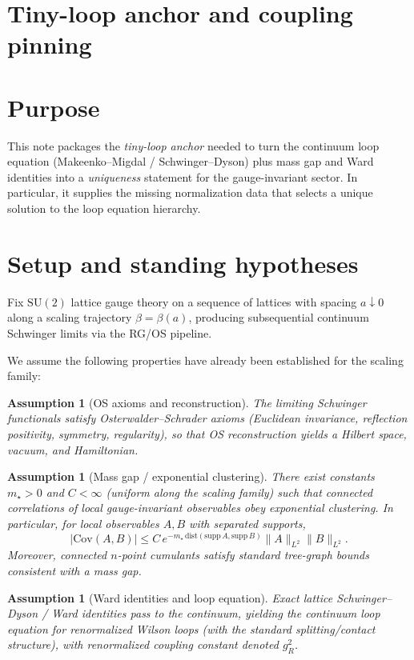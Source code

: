 \documentclass[11pt]{article}
\newtheorem{assumption}[theorem]{Assumption}
\theoremstyle{definition}
\newcommand{\Cov}{\mathrm{Cov}}
\newcommand{\SU}{\mathrm{SU}}
\newcommand{\1}{\mathbf{1}}
\begin{document}
\section{Tiny-loop anchor and coupling pinning}\label{sec:anchor}
\section{Purpose}
This note packages the \emph{tiny-loop anchor} needed to turn the continuum loop equation
(Makeenko--Migdal / Schwinger--Dyson) plus mass gap and Ward identities into a \emph{uniqueness}
statement for the gauge-invariant sector. In particular, it supplies the missing normalization
data that selects a unique solution to the loop equation hierarchy.

\section{Setup and standing hypotheses}
Fix $\SU(2)$ lattice gauge theory on a sequence of lattices with spacing $a\downarrow 0$ along a
scaling trajectory $\beta=\beta(a)$, producing subsequential continuum Schwinger limits via the
RG/OS pipeline.

We assume the following properties have already been established for the scaling family:
\begin{assumption}[OS axioms and reconstruction]\label{ass:OS}
The limiting Schwinger functionals satisfy Osterwalder--Schrader axioms (Euclidean invariance,
reflection positivity, symmetry, regularity), so that OS reconstruction yields a Hilbert space,
vacuum, and Hamiltonian.
\end{assumption}

\begin{assumption}[Mass gap / exponential clustering]\label{ass:gap}
There exist constants $m_\star>0$ and $C<\infty$ (uniform along the scaling family) such that
connected correlations of local gauge-invariant observables obey exponential clustering. In particular,
for local observables $A,B$ with separated supports,
\[
|\Cov(A,B)|\le C\,e^{-m_\star\,\mathrm{dist}(\mathrm{supp}\,A,\mathrm{supp}\,B)}\|A\|_{L^2}\|B\|_{L^2}.
\]
Moreover, connected $n$-point cumulants satisfy standard tree-graph bounds consistent with
a mass gap.
\end{assumption}

\begin{assumption}[Ward identities and loop equation]\label{ass:WardLoop}
Exact lattice Schwinger--Dyson / Ward identities pass to the continuum, yielding the continuum
loop equation for renormalized Wilson loops (with the standard splitting/contact structure),
with renormalized coupling constant denoted $g_R^2$.
\end{assumption}
\end{document}
